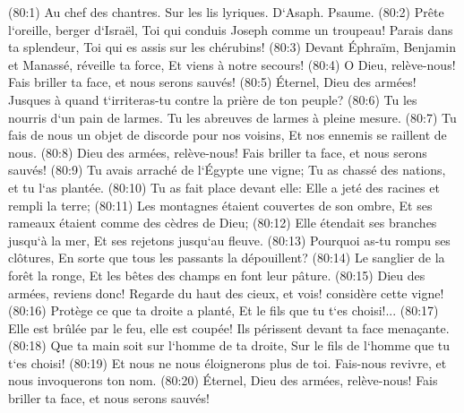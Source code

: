 \verse (80:1) Au chef des chantres. Sur les lis lyriques. D`Asaph. Psaume. (80:2) Prête l`oreille, berger d`Israël, Toi qui conduis Joseph comme un troupeau! Parais dans ta splendeur, Toi qui es assis sur les chérubins! 
\verse (80:3) Devant Éphraïm, Benjamin et Manassé, réveille ta force, Et viens à notre secours! 
\verse (80:4) O Dieu, relève-nous! Fais briller ta face, et nous serons sauvés! 
\verse (80:5) Éternel, Dieu des armées! Jusques à quand t`irriteras-tu contre la prière de ton peuple? 
\verse (80:6) Tu les nourris d`un pain de larmes. Tu les abreuves de larmes à pleine mesure. 
\verse (80:7) Tu fais de nous un objet de discorde pour nos voisins, Et nos ennemis se raillent de nous. 
\verse (80:8) Dieu des armées, relève-nous! Fais briller ta face, et nous serons sauvés! 
\verse (80:9) Tu avais arraché de l`Égypte une vigne; Tu as chassé des nations, et tu l`as plantée. 
\verse (80:10) Tu as fait place devant elle: Elle a jeté des racines et rempli la terre; 
\verse (80:11) Les montagnes étaient couvertes de son ombre, Et ses rameaux étaient comme des cèdres de Dieu; 
\verse (80:12) Elle étendait ses branches jusqu`à la mer, Et ses rejetons jusqu`au fleuve. 
\verse (80:13) Pourquoi as-tu rompu ses clôtures, En sorte que tous les passants la dépouillent? 
\verse (80:14) Le sanglier de la forêt la ronge, Et les bêtes des champs en font leur pâture. 
\verse (80:15) Dieu des armées, reviens donc! Regarde du haut des cieux, et vois! considère cette vigne! 
\verse (80:16) Protège ce que ta droite a planté, Et le fils que tu t`es choisi!... 
\verse (80:17) Elle est brûlée par le feu, elle est coupée! Ils périssent devant ta face menaçante. 
\verse (80:18) Que ta main soit sur l`homme de ta droite, Sur le fils de l`homme que tu t`es choisi! 
\verse (80:19) Et nous ne nous éloignerons plus de toi. Fais-nous revivre, et nous invoquerons ton nom. 
\verse (80:20) Éternel, Dieu des armées, relève-nous! Fais briller ta face, et nous serons sauvés! 

\chapter{}

